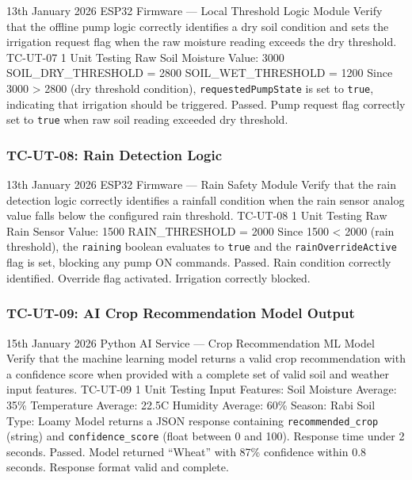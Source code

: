 \testcase%
{13th January 2026}%
{ESP32 Firmware --- Local Threshold Logic Module}%
{Verify that the offline pump logic correctly identifies
a dry soil condition and sets the irrigation request flag
when the raw moisture reading exceeds the dry threshold.}%
{TC-UT-07}%
{1}%
{Unit Testing}%
{Raw Soil Moisture Value: 3000 \newline
SOIL\_DRY\_THRESHOLD = 2800 \newline
SOIL\_WET\_THRESHOLD = 1200}%
{Since 3000 \textgreater{} 2800 (dry threshold condition),
\texttt{requestedPumpState} is set to \texttt{true},
indicating that irrigation should be triggered.}%
{Passed. Pump request flag correctly set to \texttt{true}
when raw soil reading exceeded dry threshold.}

\subsubsection{TC-UT-08: Rain Detection Logic}

\testcase%
{13th January 2026}%
{ESP32 Firmware --- Rain Safety Module}%
{Verify that the rain detection logic correctly identifies
a rainfall condition when the rain sensor analog value
falls below the configured rain threshold.}%
{TC-UT-08}%
{1}%
{Unit Testing}%
{Raw Rain Sensor Value: 1500 \newline
RAIN\_THRESHOLD = 2000}%
{Since 1500 \textless{} 2000 (rain threshold), the
\texttt{raining} boolean evaluates to \texttt{true} and
the \texttt{rainOverrideActive} flag is set, blocking any
pump ON commands.}%
{Passed. Rain condition correctly identified. Override
flag activated. Irrigation correctly blocked.}

\subsubsection{TC-UT-09: AI Crop Recommendation Model Output}

\testcase%
{15th January 2026}%
{Python AI Service --- Crop Recommendation ML Model}%
{Verify that the machine learning model returns a valid
crop recommendation with a confidence score when provided
with a complete set of valid soil and weather input
features.}%
{TC-UT-09}%
{1}%
{Unit Testing}%
{Input Features: \newline
Soil Moisture Average: 35\% \newline
Temperature Average: 22.5\textdegree{}C \newline
Humidity Average: 60\% \newline
Season: Rabi \newline
Soil Type: Loamy}%
{Model returns a JSON response containing
\texttt{recommended\_crop} (string) and
\texttt{confidence\_score} (float between 0 and 100).
Response time under 2 seconds.}%
{Passed. Model returned ``Wheat'' with 87\% confidence
within 0.8 seconds. Response format valid and complete.}

